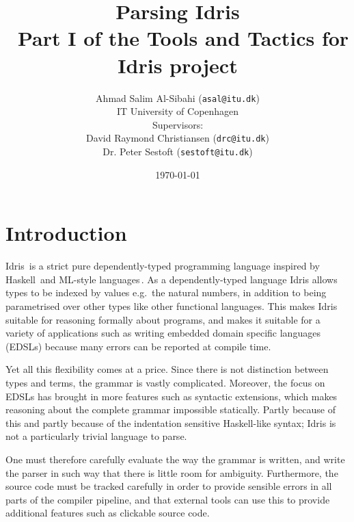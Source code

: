 \documentclass[a4paper]{article}%
\begin{document}
\title{Parsing Idris \\ \normalsize{Part I of the Tools and Tactics for Idris project}}
\author{Ahmad Salim Al-Sibahi (\texttt{asal@itu.dk}) \\IT University of Copenhagen\\Supervisors: \\David Raymond Christiansen (\texttt{drc@itu.dk})\\ Dr. Peter Sestoft (\texttt{sestoft@itu.dk})}
\date{\today}


\maketitle
\lstset{basicstyle=\scriptsize\unicodemonofamily, captionpos=b, extendedchars=false, numbers=left, stepnumber=3, firstnumber=1, language=Haskell}



\section{Introduction}
\label{sec:Introduction}

Idris\,\cite{brady2013idris} is a strict pure dependently-typed programming language inspired by Haskell\,\cite{marlow2010haskell} and ML-style languages\,\cite{milner1997definition}.
As a dependently-typed language Idris allows types to be indexed by values e.g.\ the natural numbers, in addition to being parametrised over other types
like other functional languages.
This makes Idris suitable for reasoning formally about programs, and makes it suitable for a variety of applications
such as writing  embedded domain specific languages (EDSLs) because many errors can be reported at compile time.

Yet all this flexibility comes at a price.
Since there is not distinction between types and terms, the grammar is vastly complicated. Moreover, the focus on EDSLs has brought in more features such as syntactic extensions,
which makes reasoning about the complete grammar impossible statically.
Partly because of this and partly because of the indentation sensitive Haskell-like syntax; Idris is not a particularly trivial language to parse.

One must therefore carefully evaluate the way the grammar is written, and write the parser in such way that there is little room for ambiguity.
Furthermore, the source code must be tracked carefully in order to provide sensible errors in all parts of the compiler pipeline, and that external tools can use this to provide additional features such as clickable source code.
\end{document}

